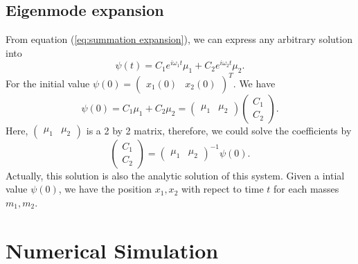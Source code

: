 \documentclass[a4paper, reprint, showkeys, nofootinbib,twoside]{revtex4-1}
\begin{document}
	\subsection{Eigenmode expansion}
	From equation (\ref{eq:summation expansion}), we can express any arbitrary solution into 
	\begin{equation}
	\psi\left(t\right) = C_1e^{i\omega_1 t}\mu_1+C_2e^{i\omega_2 t}\mu_2.
	\end{equation}
	For the initial value $\psi\left(0\right) = \begin{pmatrix}x_1\left(0\right)&x_2\left(0\right)\end{pmatrix}^T$. We have
	\begin{equation}
	\psi\left(0\right) = C_1\mu_1+C_2\mu_2 
	= \begin{pmatrix}\mu_1&\mu_2\end{pmatrix}\begin{pmatrix}C_1\\C_2\end{pmatrix}.
	\end{equation}
	Here, $\begin{pmatrix}\mu_1&\mu_2\end{pmatrix}$ is a 2 by 2 matrix, therefore, we could solve the coefficients by 
	\begin{equation}
	\begin{pmatrix}C_1\\C_2\end{pmatrix} =  \begin{pmatrix}\mu_1&\mu_2\end{pmatrix}^{-1}\psi\left(0\right).
	\end{equation}
	Actually, this solution is also the analytic solution of this system. Given a intial value $\psi(0)$, we have the position $x_1,x_2$ with repect to time $t$ for each masses $m_1, m_2$.
	\section{Numerical Simulation}
\end{document}
